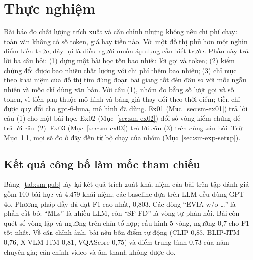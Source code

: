 \section{Thực nghiệm}\label{sec:sm-exp}
Bài báo đo chất lượng trích xuất và căn chỉnh nhưng không nêu chi phí chạy: toàn văn không có số token, giá hay tiền nào.
Với một đồ thị phủ hơn một nghìn điểm kiến thức, đây lại là điều người muốn áp dụng cần biết trước.
Phần này trả lời ba câu hỏi: (1) dựng một bài học tốn bao nhiêu lời gọi và token; (2) kiểm chứng đổi được bao nhiêu chất lượng với chi phí thêm bao nhiêu; (3) chỉ mục theo khái niệm của đồ thị tìm đúng đoạn bài giảng tốt đến đâu so với mốc ngẫu nhiên và mốc chỉ dùng văn bản.
Với câu (1), nhóm đo bằng số lượt gọi và số token, vì tiền phụ thuộc mô hình và bảng giá thay đổi theo thời điểm; tiền chỉ được quy đổi cho gpt-6-luna, mô hình đã dùng.
Ex01 (Mục~\ref{sec:sm-ex01}) trả lời câu (1) cho một bài học.
Ex02 (Mục~\ref{sec:sm-ex02}) đổi số vòng kiểm chứng để trả lời câu (2).
Ex03 (Mục~\ref{sec:sm-ex03}) trả lời câu (3) trên cùng sáu bài.
Trừ Mục~\ref{sec:sm-exp-pub}, mọi số đo ở đây đến từ bộ chạy của nhóm (Mục~\ref{sec:sm-exp-setup}).

\subsection{Kết quả công bố làm mốc tham chiếu}\label{sec:sm-exp-pub}
Bảng~\ref{tab:sm-pub} lấy lại kết quả trích xuất khái niệm của bài trên tập đánh giá gồm 100 bài học và 4.479 khái niệm; các baseline dựa trên LLM đều dùng GPT-4o.
Phương pháp đầy đủ đạt F1 cao nhất, 0,803.
Các dòng ``EVIA w/o \dots'' là phần cắt bỏ: ``MLs'' là nhiều LLM, còn ``SF-FD'' là vòng tự phản hồi.
Bài còn quét số vòng lặp và ngưỡng trên chín tổ hợp; cấu hình 5 vòng, ngưỡng 0,7 cho F1 tốt nhất.
Về căn chỉnh ảnh, bài nêu bốn điểm tự động (CLIP 0,83, BLIP-ITM 0,76, X-VLM-ITM 0,81, VQAScore 0,75) và điểm trung bình 0,73 của năm chuyên gia; căn chỉnh video và âm thanh không được đo.

